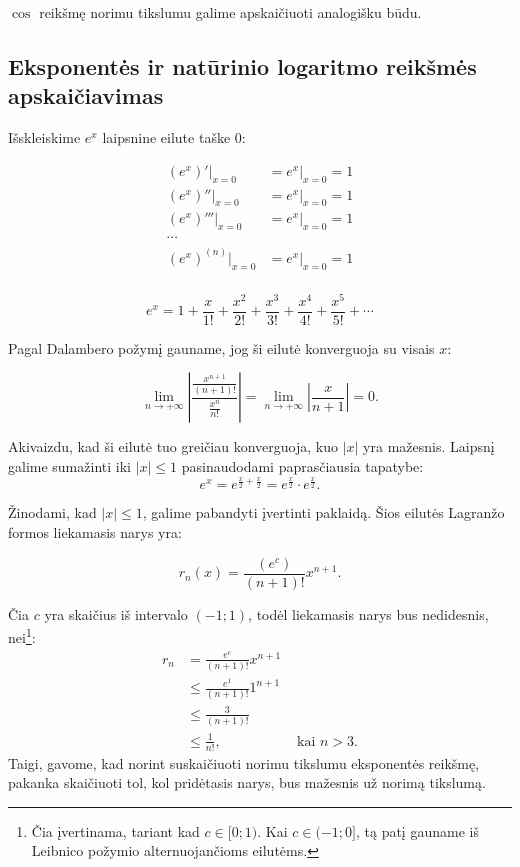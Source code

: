 $\cos$ reikšmę norimu tikslumu galime apskaičiuoti analogišku būdu.

\subsection{Eksponentės ir natūrinio logaritmo reikšmės apskaičiavimas}

Išskleiskime $e^{x}$ laipsnine eilute taške $0$:

\begin{align*}
  (e^{x})'|_{x=0} &= e^{x}|_{x=0} = 1 \\
  (e^{x})''|_{x=0} &= e^{x}|_{x=0} = 1 \\
  (e^{x})'''|_{x=0} &= e^{x}|_{x=0} = 1 \\
  \cdots \\
  (e^{x})^{(n)}|_{x=0} &= e^{x}|_{x=0} = 1 \\
\end{align*}

\begin{equation}
  e^{x} = 1 + \frac{x}{1!} + \frac{x^2}{2!} + \frac{x^3}{3!} +%
    \frac{x^4}{4!} + \frac{x^5}{5!} + \cdots
  \label{e_1}
\end{equation}

Pagal Dalambero požymį gauname, jog ši eilutė konverguoja su visais $x$:

\begin{equation*}
  \lim_{n \to +\infty} 
    \left| \frac{\frac{x^{n+1}}{(n+1)!}}{\frac{x^n}{n!}} \right| =
    \lim_{n \to +\infty} \left| \frac{x}{n+1} \right| = 0.
\end{equation*}

Akivaizdu, kad ši eilutė tuo greičiau konverguoja, kuo $|x|$ yra mažesnis.
Laipsnį galime sumažinti iki $|x| \leq 1$ pasinaudodami paprasčiausia
tapatybe:
\begin{equation*}
  e^{x} = e^{\frac{x}{2} + \frac{x}{2}} =%
    e^{\frac{x}{2}} \cdot e^{\frac{x}{2}}.
\end{equation*}

Žinodami, kad $|x| \leq 1$, galime pabandyti įvertinti paklaidą. Šios 
eilutės Lagranžo formos liekamasis narys yra:

\begin{equation}
  r_n (x) = \frac{(e^c)}{(n + 1)!} x^{n + 1}.
\end{equation}

Čia $c$ yra skaičius iš intervalo $(-1; 1)$, todėl liekamasis narys bus
nedidesnis, nei\footnote{Čia įvertinama, tariant kad $c \in [0; 1)$.
Kai $c \in (-1; 0]$, tą patį gauname iš Leibnico požymio 
alternuojančioms eilutėms.}:
\begin{align*}
  r_{n} %
  &= \frac{e^{c}}{(n + 1)!} x^{n+1} \\
  &\leq \frac{e^{1}}{(n + 1)!} 1^{n+1} \\
  &\leq \frac{3}{(n + 1)!} \\
  &\leq \frac{1}{n!}, &\text{ kai } n > 3.
\end{align*}
Taigi, gavome, kad norint suskaičiuoti norimu tikslumu eksponentės 
reikšmę, pakanka skaičiuoti tol, kol pridėtasis narys, bus mažesnis
už norimą tikslumą.

